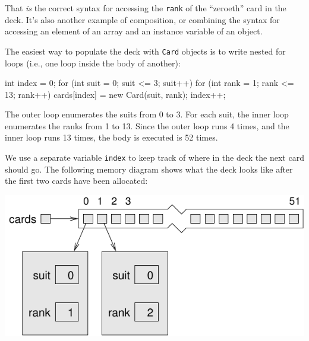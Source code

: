 \documentclass[12pt]{book}
\makeatletter
\renewcommand{\section}{\@startsection {section}{1}{\z@}%
    {-3.5ex \@plus -1ex \@minus -.2ex}%
    {0.7ex \@plus.2ex}%
    {\normalfont\Large\bfseries}}
\theoremstyle{exercise}
\newcommand{\java}[1]{\lstinline{#1}} %
\makeatother
\begin{document}

That {\em is} the correct syntax for accessing the \java{rank} of the ``zeroeth'' card in the deck.
It's also another example of composition, or combining the syntax for accessing an element of an array and an instance variable of an object.


The easiest way to populate the deck with \java{Card} objects is to write nested for loops (i.e., one loop inside the body of another):

\begin{code}
    int index = 0;
    for (int suit = 0; suit <= 3; suit++) {
        for (int rank = 1; rank <= 13; rank++) {
            cards[index] = new Card(suit, rank);
            index++;
        }
    }
\end{code}

The outer loop enumerates the suits from 0 to 3.
For each suit, the inner loop enumerates the ranks from 1 to 13.
Since the outer loop runs 4 times, and the inner loop runs 13 times, the body is executed is 52 times.


We use a separate variable \java{index} to keep track of where in the deck the next card should go.
The following memory diagram shows what the deck looks like after the first two cards have been allocated:

\begin{center}
\includegraphics{figs/cardarray2.pdf}
\end{center}



\end{document}
